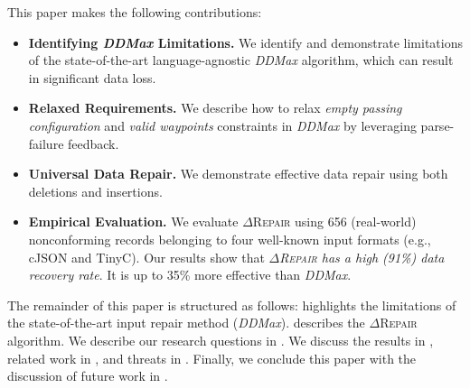 \documentclass[acmsmall,screen,review,anonymous]{acmart}
\newcommand{\dtask}{data repair\xspace}
\newcommand{\approach}{\textsc{$\Delta$Repair}\xspace}
\newcommand{\ddmax}{\textit{DDMax}\xspace}
\newcommand{\drepair}{\approach}
\begin{document}
This paper makes the following
contributions:
\begin{itemize}
\item \textbf{Identifying \ddmax Limitations.}
We identify and demonstrate limitations of 
the state-of-the-art language-agnostic \ddmax algorithm, which can result in significant data loss.
\item \textbf{Relaxed Requirements.} We describe how to relax
\emph{empty passing configuration} and \emph{valid waypoints} constraints in \ddmax by leveraging parse-failure feedback.
\item \textbf{Universal Data Repair.}
We demonstrate effective \dtask using both deletions and insertions.
\item \textbf{Empirical Evaluation.} We evaluate \drepair using 656 (real-world) nonconforming
records belonging to four well-known input formats (e.g., cJSON and TinyC). 
Our results show that
\textit{\drepair has a high (91\%) data recovery rate}. 
It is up to 35\% more effective than \ddmax.

\end{itemize}

The remainder of this paper is structured as follows: 
 highlights the limitations of the 
state-of-the-art input repair method (\ddmax).
describes the \drepair algorithm. We describe our research questions in
.
We discuss the results in ,
related work in , and threats in .
Finally, we conclude this paper 
with the discussion of future work in . 
\end{document}
